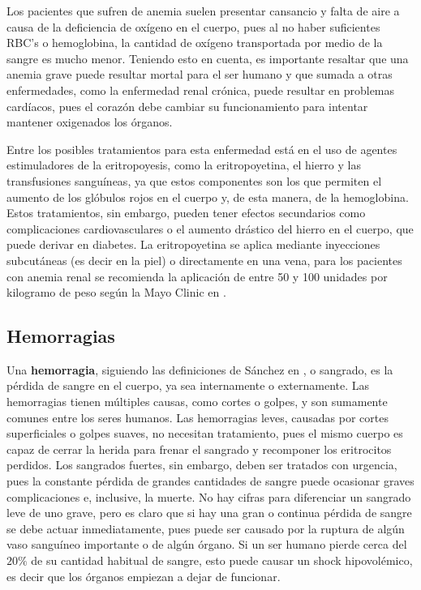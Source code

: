 Los pacientes que sufren de anemia suelen presentar cansancio y falta de aire a causa de la deficiencia de oxígeno en el cuerpo, pues al no haber suficientes RBC's o hemoglobina, la cantidad de oxígeno transportada por medio de la sangre es mucho menor. Teniendo esto en cuenta, es importante resaltar que una anemia grave puede resultar mortal para el ser humano y que sumada a otras enfermedades, como la enfermedad renal crónica, puede resultar en problemas cardíacos, pues el corazón debe cambiar su funcionamiento para intentar mantener oxigenados los órganos.

Entre los posibles tratamientos para esta enfermedad está en el uso de agentes estimuladores de la eritropoyesis, como la eritropoyetina, el hierro y las transfusiones sanguíneas, ya que estos componentes son los que permiten el aumento de los glóbulos rojos en el cuerpo y, de esta manera, de la hemoglobina. Estos tratamientos, sin embargo, pueden tener efectos secundarios como complicaciones cardiovasculares o el aumento drástico del hierro en el cuerpo, que puede derivar en diabetes. La eritropoyetina se aplica mediante inyecciones subcutáneas (es decir en la piel) o directamente en una vena, para los pacientes con anemia renal se recomienda la aplicación de entre 50 y 100 unidades por kilogramo de peso según la Mayo Clinic en \cite{MayoClinic}.

\subsection{Hemorragias}\label{subsec:RBC:enfermedades:hemorragias}
Una \textbf{hemorragia}, siguiendo las definiciones de Sánchez en \cite{Sanchez2000Hemorragias}, o sangrado, es la pérdida de sangre en el cuerpo, ya sea internamente o externamente. Las hemorragias tienen múltiples causas, como cortes o golpes, y son sumamente comunes entre los seres humanos. Las hemorragias leves, causadas por cortes superficiales o golpes suaves, no necesitan tratamiento, pues el mismo cuerpo es capaz de cerrar la herida para frenar el sangrado y recomponer los eritrocitos perdidos. Los sangrados fuertes, sin embargo, deben ser tratados con urgencia, pues la constante pérdida de grandes cantidades de sangre puede ocasionar graves complicaciones e, inclusive, la muerte. No hay cifras para diferenciar un sangrado leve de uno grave, pero es claro que si hay una gran o continua pérdida de sangre se debe actuar inmediatamente, pues puede ser causado por la ruptura de algún vaso sanguíneo importante o de algún órgano. Si un ser humano pierde cerca del $20\%$ de su cantidad habitual de sangre, esto puede causar un shock hipovolémico, es decir que los órganos empiezan a dejar de funcionar.

